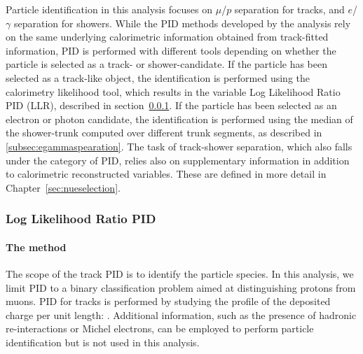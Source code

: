 Particle identification in this analysis focuses on $\mu$/$p$ separation for tracks, and $e$/$\gamma$ separation for showers. While the PID methods developed by the analysis rely on the same underlying calorimetric information obtained from track-fitted \dedx information, PID is performed with different tools depending on whether the particle is selected as a track- or shower-candidate.
If the particle has been selected as a track-like object, the identification is performed using the calorimetry likelihood tool, which results in the variable Log Likelihood Ratio PID (LLR), described in section~\ref{subsec:loglikelihoodpid}.
If the particle has been selected as an electron or photon candidate, the identification is performed using the median \dedx of the shower-trunk computed over different trunk segments, as described in \ref{subsec:egammaspearation}.
The task of track-shower separation, which also falls under the category of PID, relies also on supplementary information in addition to calorimetric \dedx reconstructed variables. These are defined in more detail in Chapter~\ref{sec:nueselection}.

\subsubsection{Log Likelihood Ratio PID}
\label{subsec:loglikelihoodpid}

\paragraph{The method}
The scope of the track PID is to identify the particle species. In this analysis, we limit PID to a binary classification problem aimed at distinguishing protons from muons. PID for tracks is performed by studying the profile of the deposited charge per unit length: \dedx.  %
Additional information, such as the presence of hadronic re-interactions or Michel electrons, can be employed to perform particle identification but is not used in this analysis.


